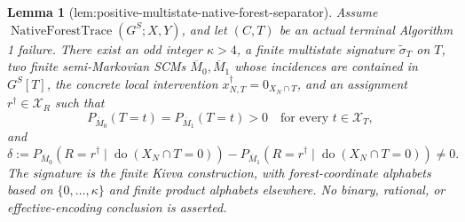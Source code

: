 \documentclass{article}
\newtheorem{lemma}{Lemma}
\begin{document}
\begin{lemma}[lem:positive-multistate-native-forest-separator]\label{lem:positive-multistate-native-forest-separator}
Assume \(\operatorname{NativeForestTrace}(G^S;X,Y)\), and let \((C,T)\) be an actual terminal Algorithm 1 failure. There exist an odd integer \(\kappa>4\), a finite multistate signature \(\widetilde\sigma_T\) on \(T\), two finite semi-Markovian SCMs \(\overline M_0,\overline M_1\) whose incidences are contained in \(G^S[T]\), the concrete local intervention \(x_{N,T}^\dagger=0_{X_N\cap T}\), and an assignment \(r^\dagger\in\mathcal X_R\) such that
\[
 P_{\overline M_0}(T=t)=P_{\overline M_1}(T=t)>0
 \quad\text{for every }t\in\mathcal X_T,
\]
and
\[
 \delta:=P_{\overline M_0}(R=r^\dagger\mid\operatorname{do}(X_N\cap T=0))
 -P_{\overline M_1}(R=r^\dagger\mid\operatorname{do}(X_N\cap T=0))\ne0.
\]
The signature is the finite Kivva construction, with forest-coordinate alphabets based on \(\{0,\ldots,\kappa\}\) and finite product alphabets elsewhere. No binary, rational, or effective-encoding conclusion is asserted.
\end{lemma}
\end{document}
